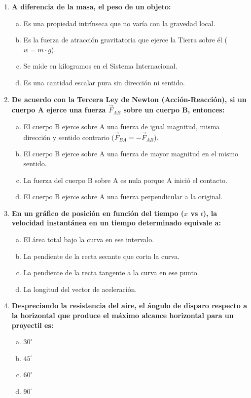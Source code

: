 \documentclass[11pt,a4paper]{article}
\begin{document}
\begin{enumerate}
    \item \textbf{A diferencia de la masa, el peso de un objeto:}
    \begin{enumerate}[a)]
        \item Es una propiedad intrínseca que no varía con la gravedad local.
        \item Es la fuerza de atracción gravitatoria que ejerce la Tierra sobre él ($w = m \cdot g$).
        \item Se mide en kilogramos en el Sistema Internacional.
        \item Es una cantidad escalar pura sin dirección ni sentido.
    \end{enumerate}

    \item \textbf{De acuerdo con la Tercera Ley de Newton (Acción-Reacción), si un cuerpo A ejerce una fuerza $\vec{F}_{AB}$ sobre un cuerpo B, entonces:}
    \begin{enumerate}[a)]
        \item El cuerpo B ejerce sobre A una fuerza de igual magnitud, misma dirección y sentido contrario ($\vec{F}_{BA} = -\vec{F}_{AB}$).
        \item El cuerpo B ejerce sobre A una fuerza de mayor magnitud en el mismo sentido.
        \item La fuerza del cuerpo B sobre A es nula porque A inició el contacto.
        \item El cuerpo B ejerce sobre A una fuerza perpendicular a la original.
    \end{enumerate}

    \item \textbf{En un gráfico de posición en función del tiempo ($x$ vs $t$), la velocidad instantánea en un tiempo determinado equivale a:}
    \begin{enumerate}[a)]
        \item El área total bajo la curva en ese intervalo.
        \item La pendiente de la recta secante que corta la curva.
        \item La pendiente de la recta tangente a la curva en ese punto.
        \item La longitud del vector de aceleración.
    \end{enumerate}

    \item \textbf{Despreciando la resistencia del aire, el ángulo de disparo respecto a la horizontal que produce el máximo alcance horizontal para un proyectil es:}
    \begin{enumerate}[a)]
        \item $30^\circ$
        \item $45^\circ$
        \item $60^\circ$
        \item $90^\circ$
    \end{enumerate}


\end{enumerate}
\end{document}
